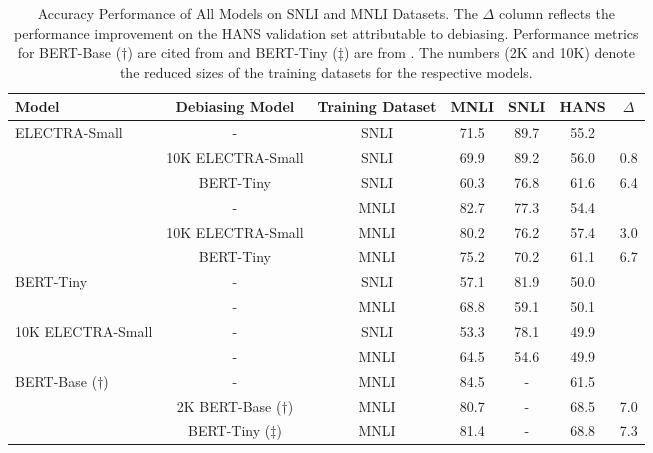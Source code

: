 \documentclass[11pt,a4paper]{article}
\begin{document}
\begin{table*}[th]
\begin{center}
\begin{tabular}{lcccccc}
\hline \textbf{Model} & \textbf{Debiasing Model} & \textbf{Training Dataset} & \textbf{MNLI} & \textbf{SNLI} & \textbf{HANS} & $\Delta$ \\ \hline
\multirow{6}{*}{ELECTRA-Small} & - & SNLI & 71.5 & 89.7 & 55.2 &  \\
& 10K ELECTRA-Small &SNLI & 69.9 & 89.2 & 56.0 & 0.8\\ 
& BERT-Tiny &SNLI & 60.3 & 76.8 & 61.6 & 6.4 \\ \cline{2-7}
& - &MNLI & 82.7 & 77.3 & 54.4 & \\ 
& 10K ELECTRA-Small &MNLI & 80.2 & 76.2 & 57.4 & 3.0 \\  
& BERT-Tiny &MNLI & 75.2 & 70.2 & 61.1 & 6.7\\ 
\hline 
\multirow{2}{*}{BERT-Tiny} &-& SNLI & 57.1 & 81.9 & 50.0 \\ \cline{2-7}
&-&MNLI & 68.8 & 59.1 & 50.1 \\ \hline 
\multirow{2}{*}{10K ELECTRA-Small} &-& SNLI & 53.3 & 78.1 & 49.9 \\ \cline{2-7}
&-&MNLI & 64.5 & 54.6 & 49.9 \\ 
\hline 
\multirow{3}{*}{BERT-Base ($\dagger$)}&-&MNLI & 84.5 & - & 61.5 \\ 
& 2K BERT-Base ($\dagger$) &MNLI & 80.7 & - & 68.5 &7.0 \\
& BERT-Tiny ($\ddagger$) &MNLI & 81.4 & - & 68.8 & 7.3 \\
\hline
\end{tabular}
\end{center}
\caption{Accuracy Performance of All Models on SNLI and MNLI Datasets. The $\Delta$ column reflects the performance improvement on the HANS validation set attributable to debiasing. Performance metrics for BERT-Base ($\dagger$) are cited from \citet{utama2020debiasing} and BERT-Tiny ($\ddagger$) are from \citet{sanh2020learning}. The numbers (2K and 10K) denote the reduced sizes of the training datasets for the respective models.}
\label{table: main-results}
\end{table*}
\end{document}
